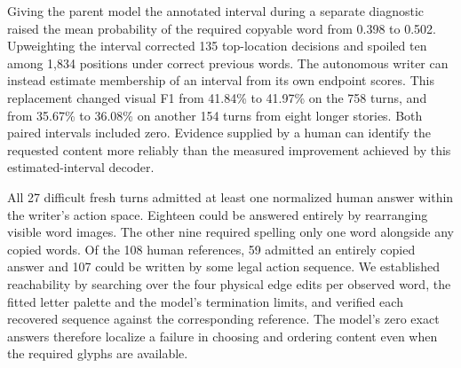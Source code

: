 Giving the parent model the annotated interval during a separate diagnostic raised the mean probability of the required copyable word from 0.398 to 0.502. Upweighting the interval corrected 135 top-location decisions and spoiled ten among 1,834 positions under correct previous words. The autonomous writer can instead estimate membership of an interval from its own endpoint scores. This replacement changed visual F1 from 41.84\% to 41.97\% on the 758 turns, and from 35.67\% to 36.08\% on another 154 turns from eight longer stories. Both paired intervals included zero. Evidence supplied by a human can identify the requested content more reliably than the measured improvement achieved by this estimated-interval decoder.

All 27 difficult fresh turns admitted at least one normalized human answer within the writer's action space. Eighteen could be answered entirely by rearranging visible word images. The other nine required spelling only one word alongside any copied words. Of the 108 human references, 59 admitted an entirely copied answer and 107 could be written by some legal action sequence. We established reachability by searching over the four physical edge edits per observed word, the fitted letter palette and the model's termination limits, and verified each recovered sequence against the corresponding reference. The model's zero exact answers therefore localize a failure in choosing and ordering content even when the required glyphs are available.
